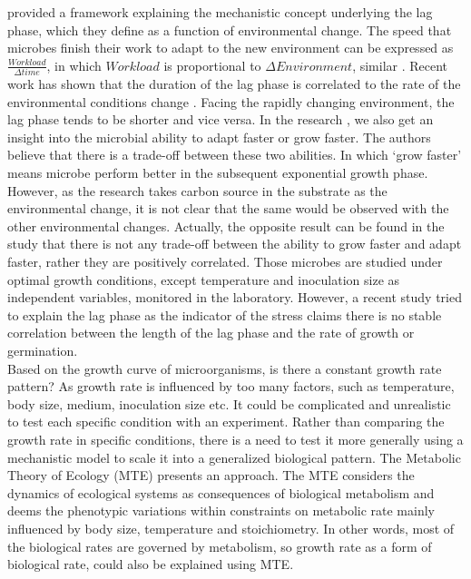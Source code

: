 \documentclass[a4paper]{article}
\begin{document}
\citealt{swinnen2004predictive} provided a framework explaining the mechanistic concept underlying the lag phase, which they define as a function of environmental change. The speed that microbes finish their work to adapt to the new environment can be expressed as $\frac{Workload}{\Delta time}$, in which $Workload$ is proportional to $\Delta Environment$, similar \citep{bertrand2019lag}. Recent work has shown that the duration of the lag phase is correlated to the rate of the environmental conditions change \citep{chu2016lag}. Facing the rapidly changing environment, the lag phase tends to be shorter and vice versa. In the research \citealt{chu2016lag}, we also get an insight into the microbial ability to adapt faster or grow faster. The authors believe that there is a trade-off between these two abilities. In which `grow faster' means microbe perform better in the subsequent exponential growth phase. However, as the research \citealt{chu2016lag} takes carbon source in the substrate as the environmental change, it is not clear that the same would be observed with the other environmental changes. Actually, the opposite result can be found in the study \citep{de2018determination} that there is not any trade-off between the ability to grow faster and adapt faster, rather they are positively correlated. Those microbes are studied under optimal growth conditions, except temperature and inoculation size as independent variables, monitored in the laboratory. However, a recent study \citealt{hamill2020microbial} tried to explain the lag phase as the indicator of the stress claims there is no stable correlation between the length of the lag phase and the rate of growth or germination. \\


Based on the growth curve of microorganisms, is there a constant growth rate pattern? As growth rate is influenced by too many factors, such as temperature, body size, medium, inoculation size etc. It could be complicated and unrealistic to test each specific condition with an experiment. Rather than comparing the growth rate in specific conditions, there is a need to test it more generally using a mechanistic model to scale it into a generalized biological pattern. The Metabolic Theory of Ecology (MTE) \citep{brown2004toward} presents an approach. The MTE considers the dynamics of ecological systems as consequences of biological metabolism and deems the phenotypic variations within constraints on metabolic rate mainly influenced by body size, temperature and stoichiometry. In other words, most of the biological rates are governed by metabolism, so growth rate as a form of biological rate, could also be explained using MTE. \\
\end{document}
